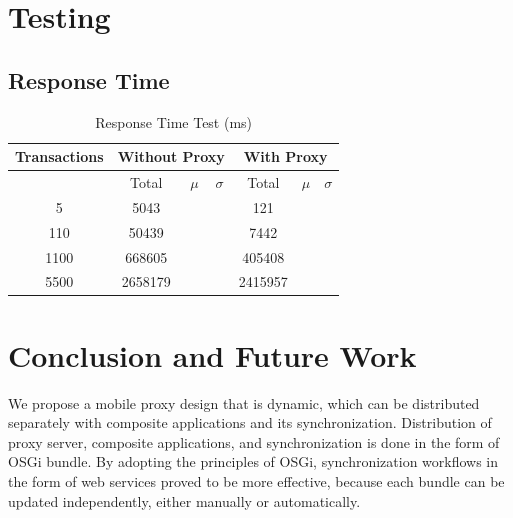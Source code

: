 \documentclass[conference]{IEEEtran}
\begin{document}




\section{Testing}
\subsection{Response Time}
\begin{table}
\renewcommand{\arraystretch}{1.3}
\caption{Response Time Test (ms)}
\label{tbl:response_time}
\centering
\begin{tabular}{|c||c|c|c|c|c|c|}
\hline
Transactions & \multicolumn{3}{|c|}{Without Proxy} & \multicolumn{3}{|c|}{With Proxy}\\
\hline
& Total & $\mu$ & $\sigma$ & Total & $\mu$ & $\sigma$\\
\hline
5 & 5043 &  &  & 121 &  & \\
\hline
110 & 50439 &  &  & 7442 &  & \\
\hline
1100 & 668605 &  &  & 405408 &  & \\
\hline
5500 & 2658179 &  &  & 2415957 &  & \\
\hline
\end{tabular}
\end{table}




\section{Conclusion and Future Work}
We propose a mobile proxy design that is dynamic, which can be distributed separately with composite applications and its synchronization. Distribution of proxy server, composite applications, and synchronization is done in the form of OSGi bundle. By adopting the principles of OSGi, synchronization workflows in the form of web services proved to be more effective, because each bundle can be updated independently, either manually or automatically.
\end{document}
